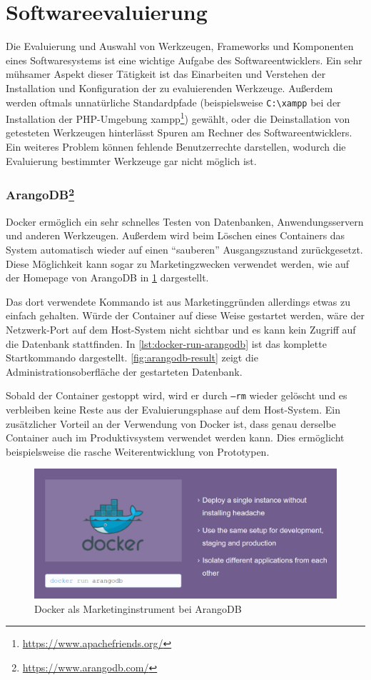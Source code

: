 \section{Softwareevaluierung}
\label{sec:softwareevaluierung}
Die Evaluierung und Auswahl von Werkzeugen, Frameworks und Komponenten eines Softwaresystems ist eine wichtige Aufgabe des Softwareentwicklers.
Ein sehr mühsamer Aspekt dieser Tätigkeit ist das Einarbeiten und Verstehen der Installation und Konfiguration der zu evaluierenden Werkzeuge.
Außerdem werden oftmals unnatürliche Standardpfade (beispielsweise \verb$C:\xampp$ bei der Installation der PHP-Umgebung xampp\footnote{\url{https://www.apachefriends.org/}}) gewählt, oder die Deinstallation von getesteten Werkzeugen hinterlässt Spuren am Rechner des Softwareentwicklers.
Ein weiteres Problem können fehlende Benutzerrechte darstellen, wodurch die Evaluierung bestimmter Werkzeuge gar nicht möglich ist.

\subsubsection{ArangoDB\protect\footnote{\url{https://www.arangodb.com/}}}
Docker ermöglich ein sehr schnelles Testen von Datenbanken, Anwendungsservern und anderen Werkzeugen.
Außerdem wird beim Löschen eines Containers das System automatisch wieder auf einen "`sauberen"' Ausgangszustand zurückgesetzt.
Diese Möglichkeit kann sogar zu Marketingzwecken verwendet werden, wie auf der Homepage von ArangoDB in \cref{fig:arangodb-docker-marketing} dargestellt.

Das dort verwendete Kommando ist aus Marketinggründen allerdings etwas zu einfach gehalten.
Würde der Container auf diese Weise gestartet werden, wäre der Netzwerk-Port auf dem Host-System nicht sichtbar und es kann kein Zugriff auf die Datenbank stattfinden.
In \cref{lst:docker-run-arangodb} ist das komplette Startkommando dargestellt.
\cref{fig:arangodb-result} zeigt die Administrationsoberfläche der gestarteten Datenbank.

Sobald der Container gestoppt wird, wird er durch \texttt{--rm} wieder gelöscht und es verbleiben keine Reste aus der Evaluierungsphase auf dem Host-System.
Ein zusätzlicher Vorteil an der Verwendung von Docker ist, dass genau derselbe Container auch im Produktivsystem verwendet werden kann.
Dies ermöglicht beispielsweise die rasche Weiterentwicklung von Prototypen.

\begin{figure}[htbp]
    \centering
    \includegraphics[width=0.7\linewidth,clip]{images/arangodb-docker-marketing}
    \caption{Docker als Marketinginstrument bei ArangoDB}
\label{fig:arangodb-docker-marketing}
\end{figure}

